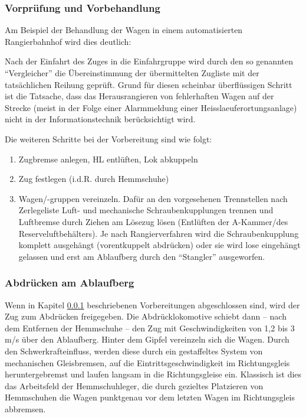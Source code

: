 \subsubsection{Vorprüfung und Vorbehandlung}\label{sec:Vorpruefung}
Am Beispiel der Behandlung der Wagen in einem automatisierten \gls{Rangierbahnhof} wird dies deutlich:\par
Nach der Einfahrt des Zuges in die Einfahrgruppe wird durch den so genannten "`Vergleicher"' die Übereinstimmung der übermittelten Zugliste mit der tatsächlichen Reihung geprüft. Grund für diesen scheinbar überflüssigen Schritt ist die Tatsache, dass das Herausrangieren von fehlerhaften Wagen auf der Strecke (meist in der Folge einer Alarmmeldung einer \gls{Heisslaeuferortungsanlage}) nicht in der Informationstechnik berücksichtigt wird.\par
Die weiteren Schritte bei der Vorbereitung sind wie folgt:
\begin{enumerate}
    \item Zugbremse anlegen, \acrshort{HL} entlüften, Lok abkuppeln
    \item Zug festlegen (i.d.R. durch \gls{Hemmschuh}e)
    \item Wagen/-gruppen vereinzeln. Dafür an den vorgesehenen Trennstellen nach Zerlegeliste Luft- und mechanische Schraubenkupplungen trennen und Luftbremse durch Ziehen am Lösezug lösen (Entlüften der A-Kammer/des Reserveluftbehälters). Je nach Rangierverfahren wird die Schraubenkupplung komplett ausgehängt (vorentkuppelt abdrücken) oder sie wird lose eingehängt gelassen und erst am \gls{Ablaufberg} durch den "`Stangler"' ausgeworfen.
\end{enumerate}
\subsubsection{Abdrücken am Ablaufberg}\label{sec:Abdruecken}
Wenn in Kapitel \ref{sec:Vorpruefung} beschriebenen Vorbereitungen abgeschlossen sind, wird der Zug zum Abdrücken freigegeben. Die Abdrücklokomotive schiebt dann -- nach dem Entfernen der Hemmschuhe -- den Zug mit Geschwindigkeiten von 1,2 bis 3 m/s %
über den \gls{Ablaufberg}. Hinter dem Gipfel vereinzeln sich die Wagen. Durch den Schwerkrafteinfluss, werden diese durch ein gestaffeltes System von mechanischen Gleisbremsen, auf die Eintrittsgeschwindigkeit im Richtungsgleis heruntergebremst und laufen langsam in die Richtungsgleise ein.  Klassisch ist dies das Arbeitsfeld der Hemmschuhleger, die durch gezieltes Platzieren von Hemmschuhen die Wagen punktgenau vor dem letzten Wagen im Richtungsgleis abbremsen.
